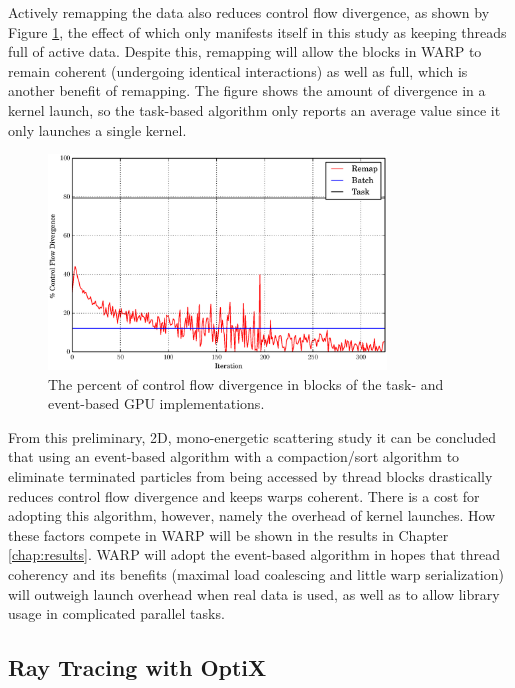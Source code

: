 Actively remapping the data also reduces control flow divergence, as shown by Figure \ref{prelim_divergence}, the effect of which  only manifests itself in this study as keeping threads full of active data.  Despite this, remapping will allow the blocks in WARP to remain coherent (undergoing identical interactions) as well as full, which is another benefit of remapping.  The figure shows the amount of divergence in a kernel launch, so the task-based algorithm only reports an average value since it only launches a single kernel.

\begin{figure}[h!] 
  \centering
    \includegraphics[width=0.8\textwidth]{graphics/prelim_divergence.eps}
     \caption{The percent of control flow divergence in blocks of the task- and event-based GPU implementations. \label{prelim_divergence} }
\end{figure}

From this preliminary, 2D, mono-energetic scattering study it can be concluded that using an event-based algorithm with a compaction/sort algorithm to eliminate terminated particles from being accessed by thread blocks drastically reduces control flow divergence and keeps warps coherent.  There is a cost for adopting this algorithm, however, namely the overhead of kernel launches.  How these factors compete in WARP will be shown in the results in Chapter \ref{chap:results}.  WARP will adopt the event-based algorithm in hopes that thread coherency and its benefits (maximal load coalescing and little warp serialization) will outweigh launch overhead when real data is used, as well as to allow library usage in complicated parallel tasks.

\subsection{Ray Tracing with OptiX}

